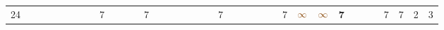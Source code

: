 \begin{landscape}
\begin{table}
\begin{adjustwidth}{-2.6cm}{}
{\begin{tabular}{l|lllllllllllllllllllllllllllllllll|ll}
		24   &            &                                                                 &                                                                 &                                                                 &                                                                 &                                                                 &                                                                 & 7                                                               &                                                                 &                                                                 &                                                                 & 7                                                               &                                                                 &                                                                 &                                                                 &                                                                 &                                                                 &                                                                 & 7                                                               &                                                                 &                                                                 &                                                                 &                                                                 &                                                                 & 7                                                               & $\textcolor[rgb]{0.541,0.29,0.043}{\infty}$ & $\textcolor[rgb]{0.541,0.29,0.043}{\infty}$ & \textbf{7}                                                      &                                                                 &                                                                 &                                                                 & 7                                                               & 7                                                               & 2          & 3           \\

\end{tabular}}
\end{adjustwidth}
\end{table}
\end{landscape}
